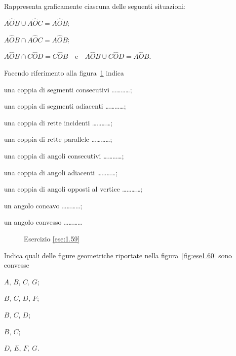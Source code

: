 \begin{esercizio}
\label{ese:1.58}
Rappresenta graficamente ciascuna delle seguenti situazioni:
\begin{enumeratea}
\item $A\widehat{O}B\cup A\widehat{O}C=A\widehat{O}B$;
\item $A\widehat{O}B\cap A\widehat{O}C=A\widehat{O}B$;
\item $A\widehat{O}B\cap 
C\widehat{O}D=C\widehat{O}B$~~e~~$A\widehat{O}B\cup 
C\widehat{O}D=A\widehat{O}B$.
\end{enumeratea}
\end{esercizio}

\begin{esercizio}
\label{ese:1.59}
Facendo riferimento alla figura~\ref{fig:ese1.59} indica
\begin{enumeratea}
\item una coppia di segmenti consecutivi \ldots\ldots\ldots\ldots{};
\item una coppia di segmenti adiacenti \ldots\ldots\ldots\ldots{};
\item una coppia di rette incidenti \ldots\ldots\ldots\ldots{};
\item una coppia di rette parallele \ldots\ldots\ldots\ldots{};
\item una coppia di angoli consecutivi \ldots\ldots\ldots\ldots{};
\item una coppia di angoli adiacenti \ldots\ldots\ldots\ldots{};
\item una coppia di angoli opposti al vertice 
\ldots\ldots\ldots\ldots{};
\item un angolo concavo \ldots\ldots\ldots\ldots{};
\item un angolo convesso \ldots\ldots\ldots\ldots{}
\end{enumeratea}
\end{esercizio}


\begin{inaccessibleblock}
 \begin{figure}[htb]
 \centering
 \caption{Esercizio \ref{ese:1.59}}\label{fig:ese1.59}
\end{figure}
\end{inaccessibleblock}

\begin{esercizio}
\label{ese:1.60}
Indica quali delle figure geometriche riportate nella 
figura~\ref{fig:ese1.60} sono convesse
\begin{multicols}{5}
\begin{enumeratea}
\item $A$, $B$, $C$, $G$;
\item $B$, $C$, $D$, $F$;
\item $B$, $C$, $D$;
\item $B$, $C$;
\item $D$, $E$, $F$, $G$.
\end{enumeratea}
\end{multicols}
\end{esercizio}



